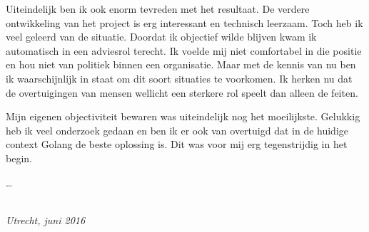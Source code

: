 Uiteindelijk ben ik ook enorm tevreden met het resultaat. De verdere ontwikkeling van het project is erg interessant en technisch leerzaam. Toch heb ik veel geleerd van de situatie. Doordat ik objectief wilde blijven kwam ik automatisch in een adviesrol terecht. Ik voelde mij niet comfortabel in die positie en hou niet van politiek binnen een organisatie.
Maar met de kennis van nu ben ik waarschijnlijk in staat om dit soort situaties te voorkomen. Ik herken nu dat de overtuigingen van mensen wellicht een sterkere rol speelt dan alleen de feiten.

Mijn eigenen objectiviteit bewaren was uiteindelijk nog het moeilijkste. Gelukkig heb ik veel onderzoek gedaan en ben ik er ook van overtuigd dat in de huidige context Golang de beste oplossing is. Dit was voor mij erg tegenstrijdig in het begin.

\ldots

\begin{flushright}
{\makeatletter\itshape
    \@author \\
    Utrecht, juni 2016
\makeatother}
\end{flushright}
\pagestyle{empty}

